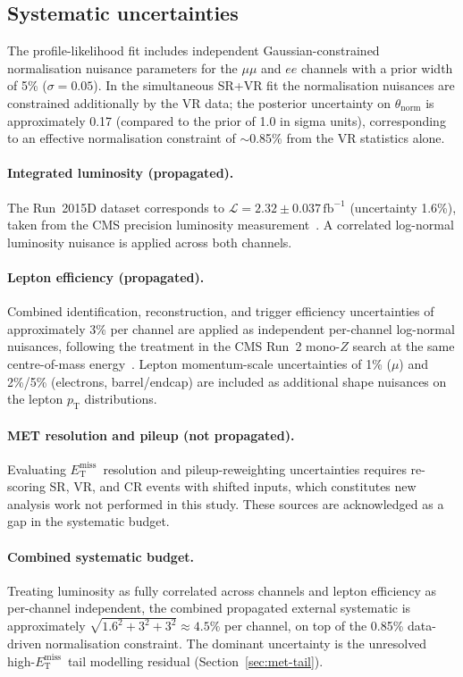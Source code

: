 \documentclass[11pt,a4paper,twocolumn]{article}
\newcommand{\MET}{\ensuremath{E_{\mathrm{T}}^{\mathrm{miss}}}}
\begin{document}
\subsection{Systematic uncertainties}
\label{sec:systematics}
The profile-likelihood fit includes independent Gaussian-constrained
normalisation nuisance parameters for the $\mu\mu$ and $ee$ channels
with a prior width of 5\% ($\sigma=0.05$).
In the simultaneous SR+VR fit the normalisation nuisances are
constrained additionally by the VR data; the posterior uncertainty on
$\theta_{\mathrm{norm}}$ is approximately 0.17 (compared to the prior
of 1.0 in sigma units), corresponding to an effective normalisation
constraint of $\sim$0.85\% from the VR statistics alone.

\paragraph{Integrated luminosity (propagated).}
The Run~2015D dataset corresponds to
$\mathcal{L}=2.32\pm0.037\,\mathrm{fb}^{-1}$ (uncertainty 1.6\%),
taken from the CMS precision luminosity measurement~\cite{CMS-LUM-2021}.
A correlated log-normal luminosity nuisance is applied across both channels.

\paragraph{Lepton efficiency (propagated).}
Combined identification, reconstruction, and trigger efficiency
uncertainties of approximately 3\% per channel are applied as
independent per-channel log-normal nuisances, following the treatment
in the CMS Run~2 mono-$Z$ search at the same centre-of-mass
energy~\cite{CMS2017MonoZ}. Lepton momentum-scale uncertainties of 1\%
($\mu$) and 2\%/5\% (electrons, barrel/endcap) are included as additional
shape nuisances on the lepton $p_{\mathrm{T}}$ distributions.

\paragraph{MET resolution and pileup (not propagated).}
Evaluating \MET\ resolution and pileup-reweighting uncertainties
requires re-scoring SR, VR, and CR events with shifted inputs, which
constitutes new analysis work not performed in this study. These
sources are acknowledged as a gap in the systematic budget.

\paragraph{Combined systematic budget.}
Treating luminosity as fully correlated across channels and lepton
efficiency as per-channel independent, the combined propagated external
systematic is approximately $\sqrt{1.6^2+3^2+3^2}\approx4.5\%$ per
channel, on top of the 0.85\% data-driven normalisation constraint.
The dominant uncertainty is the unresolved high-\MET\ tail modelling
residual (Section~\ref{sec:met-tail}).
\end{document}
